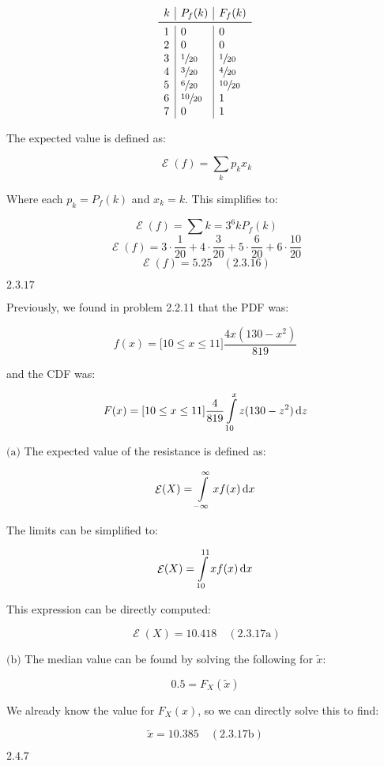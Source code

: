 \documentclass{article}
\newcommand{\problem}[2]{$\boxed{\text{#1.#2}}$}
\newcommand{\subproblem}[3]{$\boxed{\text{(#3)}}$}
\newcommand{\solution}[3]{\boxed{#3\quad(\text{#1.#2})}}
\newcommand{\subsolution}[4]{\boxed{#4\quad(\text{#1.#2#3})}}
\renewcommand{\d}[1]{\,\textnormal{d}#1}
\DeclareMathOperator{\E}{\mathcal{E}}
\begin{document}
\[
\begin{array}{l|l|l}
k & P_f(k) & F_f(k) \\
\midrule
1 & 0 & 0 \\
2 & 0 & 0 \\
3 & \sfrac{1}{20} & \sfrac{1}{20} \\
4 & \sfrac{3}{20} & \sfrac{4}{20} \\
5 & \sfrac{6}{20} & \sfrac{10}{20} \\
6 & \sfrac{10}{20} & 1 \\
7 & 0 & 1 \\
\end{array}
\]

The expected value is defined as:

\[
\E(f)=\sum\limits_k p_k x_k
\]

Where each $p_k=P_f(k)$ and $x_k=k$. This simplifies to:

\[
\E(f)=\sum\limits{k=3}^6 k P_f(k)
\] \[
\E(f)=3\cdot\frac{1}{20}+4\cdot\frac{3}{20}+5\cdot\frac{6}{20}+6\cdot\frac{10}{20}
\] \[
\solution{2.3}{16}{\E(f)=5.25}
\]

%
\problem{2.3}{17}

Previously, we found in problem 2.2.11 that the PDF was:

\[
f(x)=\lbrack10\le x\le11\rbrack \frac{4x(130-x^2)}{819}
\]

and the CDF was:

\[
F(x)=\lbrack10\le x\le11\rbrack \frac{4}{819}\int\limits_{10}^x z(130-z^2)\d{z}
\]

%
\subproblem{2.3}{17}{a} The expected value of the resistance is
defined as:

\[
\E(X)=\int\limits_{-\infty}^\infty x f(x)\d{x}
\]

The limits can be simplified to:

\[
\E(X)=\int\limits_{10}^{11} x f(x)\d{x}
\]

This expression can be directly computed:

\[
\subsolution{2.3}{17}{a}{\E(X)=10.418}
\]

%
\subproblem{2.3}{17}{b} The median value can be found by solving the
following for $\tilde{x}$:

\[
0.5=F_X(\tilde{x})
\]

We already know the value for $F_X(x)$, so we can directly solve this
to find:

\[
\subsolution{2.3}{17}{b}{\tilde{x}=10.385}
\]

%
\problem{2.4}{7}
\end{document}
